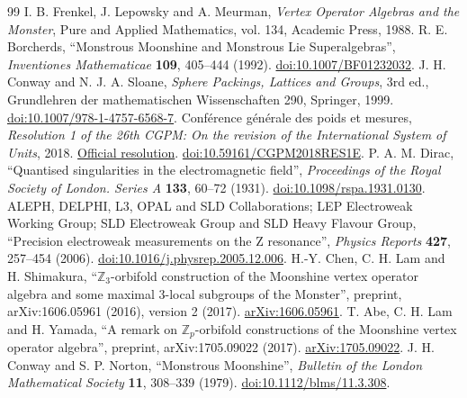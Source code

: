 \begin{thebibliography}{99}
 I. B. Frenkel, J. Lepowsky and A. Meurman, \emph{Vertex Operator Algebras and the Monster}, Pure and Applied Mathematics, vol. 134, Academic Press, 1988.
 R. E. Borcherds, ``Monstrous Moonshine and Monstrous Lie Superalgebras'', \emph{Inventiones Mathematicae} \textbf{109}, 405--444 (1992). \href{https://doi.org/10.1007/BF01232032}{doi:10.1007/BF01232032}.
 J. H. Conway and N. J. A. Sloane, \emph{Sphere Packings, Lattices and Groups}, 3rd ed., Grundlehren der mathematischen Wissenschaften 290, Springer, 1999. \href{https://doi.org/10.1007/978-1-4757-6568-7}{doi:10.1007/978-1-4757-6568-7}.
 Conférence générale des poids et mesures, \emph{Resolution 1 of the 26th CGPM: On the revision of the International System of Units}, 2018. \href{https://www.bipm.org/en/committees/cg/cgpm/26-2018/resolution-1}{Official resolution}. \href{https://doi.org/10.59161/CGPM2018RES1E}{doi:10.59161/CGPM2018RES1E}.
 P. A. M. Dirac, ``Quantised singularities in the electromagnetic field'', \emph{Proceedings of the Royal Society of London. Series A} \textbf{133}, 60--72 (1931). \href{https://doi.org/10.1098/rspa.1931.0130}{doi:10.1098/rspa.1931.0130}.
 ALEPH, DELPHI, L3, OPAL and SLD Collaborations; LEP Electroweak Working Group; SLD Electroweak Group and SLD Heavy Flavour Group, ``Precision electroweak measurements on the Z resonance'', \emph{Physics Reports} \textbf{427}, 257--454 (2006). \href{https://doi.org/10.1016/j.physrep.2005.12.006}{doi:10.1016/j.physrep.2005.12.006}.
 H.-Y. Chen, C. H. Lam and H. Shimakura, ``\(\mathbb Z_3\)-orbifold construction of the Moonshine vertex operator algebra and some maximal \(3\)-local subgroups of the Monster'', preprint, arXiv:1606.05961 (2016), version 2 (2017). \href{https://arxiv.org/abs/1606.05961}{arXiv:1606.05961}.
 T. Abe, C. H. Lam and H. Yamada, ``A remark on \(\mathbb Z_p\)-orbifold constructions of the Moonshine vertex operator algebra'', preprint, arXiv:1705.09022 (2017). \href{https://arxiv.org/abs/1705.09022}{arXiv:1705.09022}.
 J. H. Conway and S. P. Norton, ``Monstrous Moonshine'', \emph{Bulletin of the London Mathematical Society} \textbf{11}, 308--339 (1979). \href{https://doi.org/10.1112/blms/11.3.308}{doi:10.1112/blms/11.3.308}.
\end{thebibliography}
